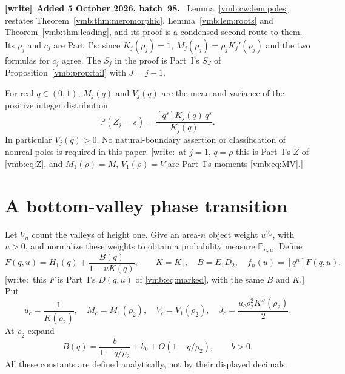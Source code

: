 \documentclass[11pt,a4paper]{article}
\numberwithin{equation}{section}
\theoremstyle{definition}\newtheorem{definition}[theorem]{Definition}
\theoremstyle{remark}\newtheorem{remark}[theorem]{Remark}
\newcommand{\Prob}{\mathbb P}
\newcommand{\coeff}[2]{[#1^{#2}]}
\newcommand{\wrt}[1]{\textup{[}\textsf{write:}~#1\textup{]}}
\newenvironment{writenote}[1][]{\par\smallskip\begingroup\small
 \noindent\textbf{[write]}\if\relax\detokenize{#1}\relax\else~\textbf{#1.}\fi\ }%
 {\par\endgroup\smallskip}
\begin{document}
\begin{writenote}[Added 5 October 2026, batch~98]
Lemma~\ref{vmb:cw:lem:poles} restates Theorem~\ref{vmb:thm:meromorphic},
Lemma~\ref{vmb:lem:roots} and Theorem~\ref{vmb:thm:leading}, and its proof is
a condensed second route to them. Its $\rho_j$ and $c_j$ are Part~I's: since
$K_j(\rho_j)=1$, $M_j(\rho_j)=\rho_jK_j'(\rho_j)$ and the two formulas for $c_j$
agree. The $S_j$ in the proof is Part~I's $S_J$ of
Proposition~\ref{vmb:prop:tail} with $J=j-1$.
\end{writenote}

For real $q\in(0,1)$, $M_j(q)$ and $V_j(q)$ are the mean and variance of
the positive integer distribution
\begin{equation}\label{vmb:cw:eq:boltzmannkernel}
 \Prob(Z_j=s)=\frac{\coeff qs K_j(q)\,q^s}{K_j(q)}.
\end{equation}
In particular $V_j(q)>0$. No natural-boundary assertion or classification of
nonreal poles is required in this paper. \wrt{at $j=1$, $q=\rho$ this is
Part~I's $Z$ of \eqref{vmb:eq:Z}, and $M_1(\rho)=M$, $V_1(\rho)=V$ are Part~I's
moments \eqref{vmb:eq:MV}.}

\section{A bottom-valley phase transition}
\label{vmb:cw:sec:transition}
Let $V_n$ count the valleys of height one. Give an area-$n$ object weight
$u^{V_n}$, with $u>0$, and normalize these weights to obtain a probability
measure $\Prob_{n,u}$. Define
\begin{equation}\label{vmb:cw:eq:F}
 F(q,u)=H_1(q)+\frac{B(q)}{1-uK(q)},\qquad
 K=K_1,\quad B=E_1D_2,\quad f_n(u)=\coeff qn F(q,u).
\end{equation}
\wrt{this $F$ is Part~I's $D(q,u)$ of \eqref{vmb:eq:marked}, with the same $B$
and $K$.} Put
\begin{equation}\label{vmb:cw:eq:critical}
 u_c=\frac1{K(\rho_2)},\quad
 M_c=M_1(\rho_2),\quad V_c=V_1(\rho_2),\quad
 J_c=\frac{u_c\rho_2^2K''(\rho_2)}2.
\end{equation}
At $\rho_2$ expand
\begin{equation}\label{vmb:cw:eq:Blaurent}
 B(q)=\frac b{1-q/\rho_2}+b_0+O(1-q/\rho_2),\qquad b>0.
\end{equation}
All these constants are defined analytically, not by their displayed decimals.
\end{document}
